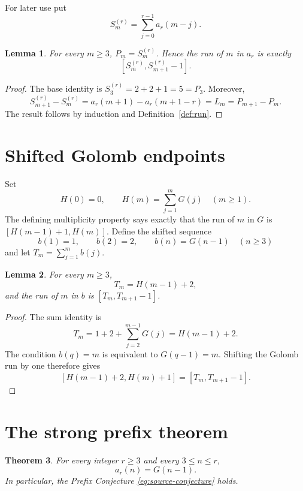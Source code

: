 \documentclass[11pt]{amsart}
\newtheorem{theorem}{Theorem}[section]
\newtheorem{lemma}[theorem]{Lemma}
\theoremstyle{definition}
\begin{document}
For later use put
\[
 S_m^{(r)}=\sum_{j=0}^{r-1}a_r(m-j).
\]

\begin{lemma}\label{lem:endpoints}
For every $m\geq3$, $P_m=S_m^{(r)}$.  Hence the run of $m$ in $a_r$ is
exactly
\[
 [S_m^{(r)},S_{m+1}^{(r)}-1].
\]
\end{lemma}

\begin{proof}
The base identity is $S_3^{(r)}=2+2+1=5=P_3$.  Moreover,
\[
 S_{m+1}^{(r)}-S_m^{(r)}
 =a_r(m+1)-a_r(m+1-r)=L_m=P_{m+1}-P_m.
\]
The result follows by induction and Definition~\ref{def:run}.
\end{proof}

\section{Shifted Golomb endpoints}

Set
\[
 H(0)=0,\qquad H(m)=\sum_{j=1}^{m}G(j)\quad(m\geq1).
\]
The defining multiplicity property says exactly that the run of $m$ in $G$
is $[H(m-1)+1,H(m)]$.  Define the shifted sequence
\[
 b(1)=1,\qquad b(2)=2,\qquad b(n)=G(n-1)\quad(n\geq3)
\]
and let $T_m=\sum_{j=1}^{m}b(j)$.

\begin{lemma}\label{lem:shift}
For every $m\geq3$,
\[
 T_m=H(m-1)+2,
\]
and the run of $m$ in $b$ is $[T_m,T_{m+1}-1]$.
\end{lemma}

\begin{proof}
The sum identity is
\[
 T_m=1+2+\sum_{j=2}^{m-1}G(j)=H(m-1)+2.
\]
The condition $b(q)=m$ is equivalent to $G(q-1)=m$.  Shifting the Golomb
run by one therefore gives
\[
 [H(m-1)+2,H(m)+1]=[T_m,T_{m+1}-1].
\]
\end{proof}

\section{The strong prefix theorem}

\begin{theorem}\label{thm:main}
For every integer $r\geq3$ and every $3\leq n\leq r$,
\[
 a_r(n)=G(n-1).
\]
In particular, the Prefix Conjecture \eqref{eq:source-conjecture} holds.
\end{theorem}
\end{document}
